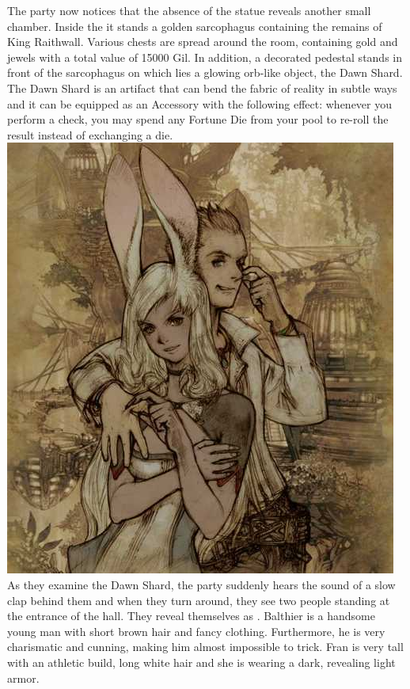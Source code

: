 The party now notices that the absence of the statue reveals another small chamber.
Inside the it stands a golden sarcophagus containing the remains of King Raithwall.
Various chests are spread around the room, containing gold and jewels with a total value of 15000 Gil.
In addition, a decorated pedestal stands in front of the sarcophagus on which lies a glowing orb-like object, the Dawn Shard.
The Dawn Shard is an artifact that can bend the fabric of reality in subtle ways and it can be equipped as an Accessory with the following effect: whenever you perform a check, you may spend any Fortune Die from your pool to re-roll the result instead of exchanging a die.
%
\vfill
%
\includegraphics[width=\columnwidth]{./art/tombofraithwall/franandbalthier.jpg}
%
\clearpage
%
As they examine the Dawn Shard, the party suddenly hears the sound of a slow clap behind them and when they turn around, they see two people standing at the entrance of the hall.
They reveal themselves as .
Balthier is a handsome young man with short brown hair and fancy clothing.
Furthermore, he is very charismatic and cunning, making him almost impossible to trick.
Fran is very tall with an athletic build, long white hair and she is wearing a dark, revealing light armor.
